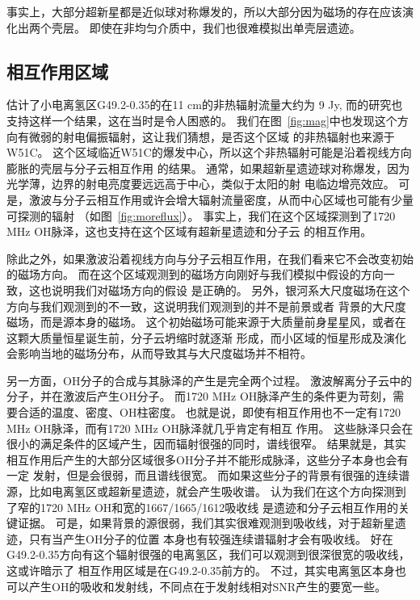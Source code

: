 事实上，大部分超新星都是近似球对称爆发的，所以大部分因为磁场的存在应该演化出两个壳层。
即使在非均匀介质中，我们也很难模拟出单壳层遗迹。

\subsection{相互作用区域}
\citet{1994JKAS...27...81M}估计了小电离氢区G49.2-0.35的在11 cm的非热辐射流量大约为
9 Jy, 而\citet{Brogan2013}的研究也支持这样一个结果，这在当时是令人困惑的。
我们在图~\ref{fig:mag}中也发现这个方向有微弱的射电偏振辐射，这让我们猜想，是否这个区域
的非热辐射也来源于W51C。
这个区域临近W51C的爆发中心，所以这个非热辐射可能是沿着视线方向膨胀的壳层与分子云相互作用
的结果。
通常，如果超新星遗迹球对称爆发，因为光学薄，边界的射电亮度要远远高于中心，类似于太阳的射
电临边增亮效应。
可是，激波与分子云相互作用或许会增大辐射流量密度，从而中心区域也可能有少量可探测的辐射
（如图~\ref{fig:moreflux}）。
事实上，我们在这个区域探测到了1720 MHz OH脉泽，这也支持在这个区域有超新星遗迹和分子云
的相互作用。

除此之外，如果激波沿着视线方向与分子云相互作用，在我们看来它不会改变初始的磁场方向。
而在这个区域观测到的磁场方向刚好与我们模拟中假设的方向一致，这也说明我们对磁场方向的假设
是正确的。
另外，银河系大尺度磁场在这个方向与我们观测到的不一致，这说明我们观测到的并不是前景或者
背景的大尺度磁场，而是源本身的磁场。
这个初始磁场可能来源于大质量前身星星风，或者在这颗大质量恒星诞生前，分子云坍缩时就逐渐
形成，而小区域的恒星形成及演化会影响当地的磁场分布，从而导致其与大尺度磁场并不相符。

另一方面，OH分子的合成与其脉泽的产生是完全两个过程。
激波解离分子云中的分子，并在激波后产生OH分子。
而1720 MHz OH脉泽产生的条件更为苛刻，需要合适的温度、密度、OH柱密度。
也就是说，即使有相互作用也不一定有1720 MHz OH脉泽，而有1720 MHz OH脉泽就几乎肯定有相互
作用。
这些脉泽只会在很小的满足条件的区域产生，因而辐射很强的同时，谱线很窄。
结果就是，其实相互作用后产生的大部分区域很多OH分子并不能形成脉泽，这些分子本身也会有一定
发射，但是会很弱，而且谱线很宽。
而如果这些分子的背景有很强的连续谱源，比如电离氢区或超新星遗迹，就会产生吸收谱。
\citet{Hewitt2008}认为我们在这个方向探测到了窄的1720 MHz OH和宽的1667/1665/1612吸收线
是遗迹和分子云相互作用的关键证据。
可是，如果背景的源很弱，我们其实很难观测到吸收线，对于超新星遗迹，只有当产生OH分子的位置
本身也有较强连续谱辐射才会有吸收线。
好在G49.2-0.35方向有这个辐射很强的电离氢区，我们可以观测到很深很宽的吸收线，这或许暗示了
相互作用区域是在G49.2-0.35前方的。
不过，其实电离氢区本身也可以产生OH的吸收和发射线，不同点在于发射线相对SNR产生的要宽一些。

